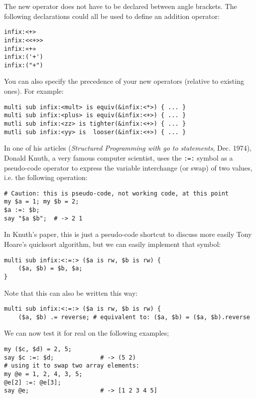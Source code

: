 The new operator does not have to be declared between 
angle brackets. The following declarations could 
all be used to define an addition operator:

\begin{verbatim}
infix:<+>
infix:<<+>>
infix:«+»
infix:('+')
infix:("+")
\end{verbatim}

You can also specify the precedence of your new 
operators (relative to existing ones). For example:

\begin{verbatim}
multi sub infix:<mult> is equiv(&infix:<*>) { ... }
multi sub infix:<plus> is equiv(&infix:<+>) { ... }
mutli sub infix:<zz> is tighter(&infix:<+>) { ... }
mutli sub infix:<yy> is  looser(&infix:<+>) { ... }
\end{verbatim}

In one of his articles (\emph{Structured Programming with 
go to statements}, Dec. 1974), Donald Knuth, a very famous 
computer scientist, uses the \verb':=:' symbol as a 
pseudo-code operator to express the variable interchange 
(or swap) of two values, i.e. the following operation:

\begin{verbatim}
# Caution: this is pseudo-code, not working code, at this point
my $a = 1; my $b = 2;
$a :=: $b; 
say "$a $b";  # -> 2 1 
\end{verbatim}

In Knuth's paper, this is just a pseudo-code shortcut 
to discuss more easily Tony Hoare's quicksort algorithm, but 
we can easily implement that symbol:

\begin{verbatim}
multi sub infix:<:=:> ($a is rw, $b is rw) {
    ($a, $b) = $b, $a;
}
\end{verbatim}

Note that this can also be written this way:

\begin{verbatim}
multi sub infix:<:=:> ($a is rw, $b is rw) {
    ($a, $b) .= reverse; # equivalent to: ($a, $b) = ($a, $b).reverse 
\end{verbatim}

We can now test it for real on the following examples;

\begin{verbatim}
my ($c, $d) = 2, 5;
say $c :=: $d;             # -> (5 2)
# using it to swap two array elements:
my @e = 1, 2, 4, 3, 5;
@e[2] :=: @e[3];
say @e;                    # -> [1 2 3 4 5]
\end{verbatim}

